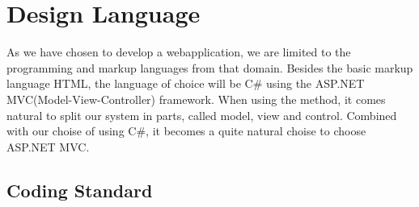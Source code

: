 \section{Design Language}
\label{sec:design_language}

As we have chosen to develop a webapplication, we are limited to the programming and markup languages from that domain.
Besides the basic markup language HTML, the language of choice will be C\# using the ASP.NET MVC(Model-View-Controller) framework. When using the \ooad method, it comes natural to split our system in parts, called model, view and control. Combined with our choise of using C\#, it becomes a quite natural choise to choose ASP.NET MVC.


\subsection{Coding Standard}